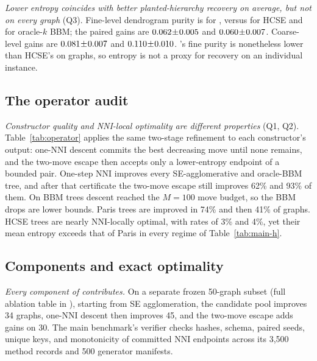 \emph{Lower entropy coincides with better planted-hierarchy recovery on
average, but not on every graph} (Q3). Fine-level dendrogram purity is
\PurityFineNEST{} for \NEST, versus \PurityFineHCSE{} for HCSE and
\PurityFineBBM{} for oracle-$k$ BBM; the paired gains are
$0.062\!\pm\!0.005$ and
$0.060\!\pm\!0.007$. Coarse-level gains are
$0.081\!\pm\!0.007$ and
$0.110\!\pm\!0.010$. \NEST's fine purity is
nonetheless lower than HCSE's on \PurityFineLowerHCSE{} graphs, so entropy is
not a proxy for recovery on an individual instance.

\subsection{The operator audit}
\emph{Constructor quality and NNI-local optimality are different properties}
(Q1, Q2). Table~\ref{tab:operator} applies the same
two-stage refinement to each constructor's output: one-NNI descent commits the
best decreasing move until none remains, and the two-move escape then accepts
only a lower-entropy endpoint of a bounded pair. One-step NNI improves every
SE-agglomerative and oracle-BBM tree, and after that certificate the two-move
escape still improves 62\% and 93\% of them. On \BBMBudgetHits{} BBM trees
descent reached the $M=100$ move budget, so the BBM drops are lower bounds. Paris trees are improved in 74\%
and then 41\% of graphs. HCSE trees are nearly NNI-locally optimal, with rates
of 3\% and 4\%, yet their mean entropy exceeds that of Paris in every regime of
Table~\ref{tab:main-h}.





\subsection{Components and exact optimality}
\emph{Every component of {\upshape\NEST} contributes.} On a separate frozen 50-graph
subset (full ablation table in \ablationdetails), starting from SE agglomeration, the
candidate pool improves 34 graphs, one-NNI descent then improves 45, and the
two-move escape adds gains on 30. The main benchmark's verifier checks hashes,
schema, paired seeds, unique keys, and monotonicity of committed NNI endpoints
across its 3,500 method records and 500 generator manifests.


